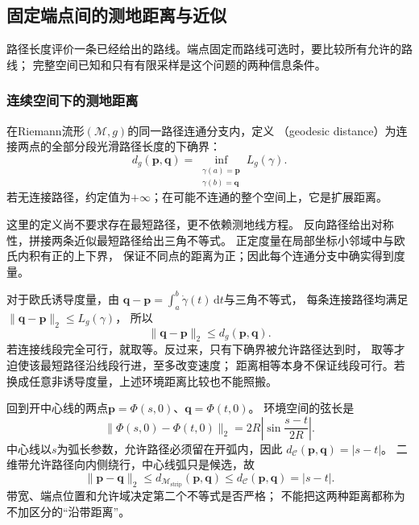 \subsection{固定端点间的测地距离与近似}
\label{sec:geometry-endpoint-distance}

路径长度评价一条已经给出的路线。端点固定而路线可选时，要比较所有允许的路线；
完整空间已知和只有有限采样是这个问题的两种信息条件。

\subsubsection{连续空间下的测地距离}
\label{sec:geometry-continuous-geodesic-distance}

\begin{definition}[测地距离]
\label{def:geometry-geodesic-distance}
在Riemann流形$(\mathcal M,g)$的同一路径连通分支内，定义
（geodesic distance）为连接两点的全部分段光滑路径长度的下确界：
\begin{equation}
 d_g(\bm p,\bm q)=
 \inf_{\substack{\gamma(a)=\bm p\\\gamma(b)=\bm q}}L_g(\gamma).
 \label{eq:geometry-geodesic-distance}
\end{equation}
若无连接路径，约定值为$+\infty$；在可能不连通的整个空间上，它是扩展距离。
\end{definition}
这里的定义尚不要求存在最短路径，更不依赖测地线方程。
反向路径给出对称性，拼接两条近似最短路径给出三角不等式。
正定度量在局部坐标小邻域中与欧氏内积有正的上下界，
保证不同点的距离为正；因此每个连通分支中确实得到度量。

对于欧氏诱导度量，由
$\bm q-\bm p=\int_a^b\dot\gamma(t)\,\mathrm dt$与三角不等式，
每条连接路径均满足$\lVert\bm q-\bm p\rVert_2\leq L_g(\gamma)$，
所以
\[
 \lVert\bm q-\bm p\rVert_2\leq d_g(\bm p,\bm q).
\]
若连接线段完全可行，就取等。反过来，只有下确界被允许路径达到时，
取等才迫使该最短路径沿线段行进，至多改变速度；
距离相等本身不保证线段可行。若换成任意非诱导度量，上述环境距离比较也不能照搬。

回到开中心线的两点$\bm p=\Phi(s,0)$、$\bm q=\Phi(t,0)$。
环境空间的弦长是
\begin{equation}
 \lVert\Phi(s,0)-\Phi(t,0)\rVert_2
 =2R\left|\sin\frac{s-t}{2R}\right|.
 \label{eq:geometry-strip-chord-distance}
\end{equation}
中心线以$s$为弧长参数，允许路径必须留在开弧内，因此
$d_{\mathcal C}(\bm p,\bm q)=|s-t|$。
二维带允许路径向内侧绕行，中心线弧只是候选，故
\[
 \lVert\bm p-\bm q\rVert_2
 \leq d_{\mathcal M_{\mathrm{strip}}}(\bm p,\bm q)
 \leq d_{\mathcal C}(\bm p,\bm q)=|s-t|.
\]
带宽、端点位置和允许域决定第二个不等式是否严格；
不能把这两种距离都称为不加区分的“沿带距离”。


